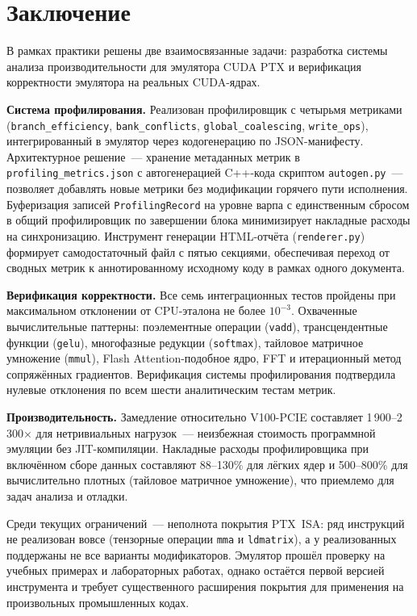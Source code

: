 \section{Заключение}

В рамках практики решены две взаимосвязанные задачи: разработка системы
анализа производительности для эмулятора CUDA PTX и верификация
корректности эмулятора на реальных CUDA-ядрах.

\textbf{Система профилирования.} Реализован профилировщик с четырьмя
метриками (\texttt{branch\_efficiency}, \texttt{bank\_conflicts},
\texttt{global\_coalescing}, \texttt{write\_ops}), интегрированный в
эмулятор через кодогенерацию по JSON-манифесту. Архитектурное решение~---
хранение метаданных метрик в \texttt{profiling\_metrics.json} с автогенерацией
C++-кода скриптом \texttt{autogen.py}~--- позволяет добавлять новые метрики
без модификации горячего пути исполнения. Буферизация записей
\texttt{ProfilingRecord} на уровне варпа с единственным сбросом в общий
профилировщик по завершении блока минимизирует накладные расходы на синхронизацию.
Инструмент генерации HTML-отчёта (\texttt{renderer.py}) формирует
самодостаточный файл с пятью секциями, обеспечивая переход от сводных
метрик к аннотированному исходному коду в рамках одного документа.

\textbf{Верификация корректности.} Все семь интеграционных тестов пройдены
при максимальном отклонении от CPU-эталона не более $10^{-3}$.
Охваченные вычислительные паттерны: поэлементные операции (\texttt{vadd}),
трансцендентные функции (\texttt{gelu}), многофазные редукции (\texttt{softmax}),
тайловое матричное умножение (\texttt{mmul}), Flash Attention-подобное ядро,
FFT и итерационный метод сопряжённых градиентов. Верификация системы
профилирования подтвердила нулевые отклонения по всем шести аналитическим
тестам метрик.

\textbf{Производительность.} Замедление относительно V100-PCIE составляет
1\,900--2\,300$\times$ для нетривиальных нагрузок~--- неизбежная стоимость
программной эмуляции без JIT-компиляции. Накладные расходы профилировщика
при включённом сборе данных составляют 88--130\% для лёгких ядер и
500--800\% для вычислительно плотных (тайловое матричное умножение),
что приемлемо для задач анализа и отладки.

Среди текущих ограничений~--- неполнота покрытия PTX~ISA: ряд инструкций
не реализован вовсе (тензорные операции \texttt{mma} и \texttt{ldmatrix}),
а у реализованных поддержаны не все варианты модификаторов. Эмулятор
прошёл проверку на учебных примерах и лабораторных работах, однако
остаётся первой версией инструмента и требует существенного расширения
покрытия для применения на произвольных промышленных кодах.

\newpage
